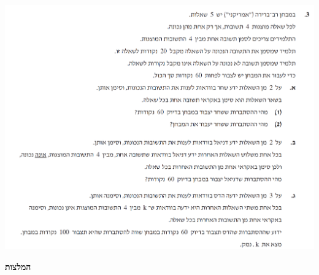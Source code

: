 \documentclass[12pt,a4paper]{article}
\begin{document}
\begin{center}
\includegraphics[width=\textwidth]{summer-2018b-3}
\end{center}



\newpage

\begin{center}
\textbf{המלצות}
\end{center}
\end{document}
